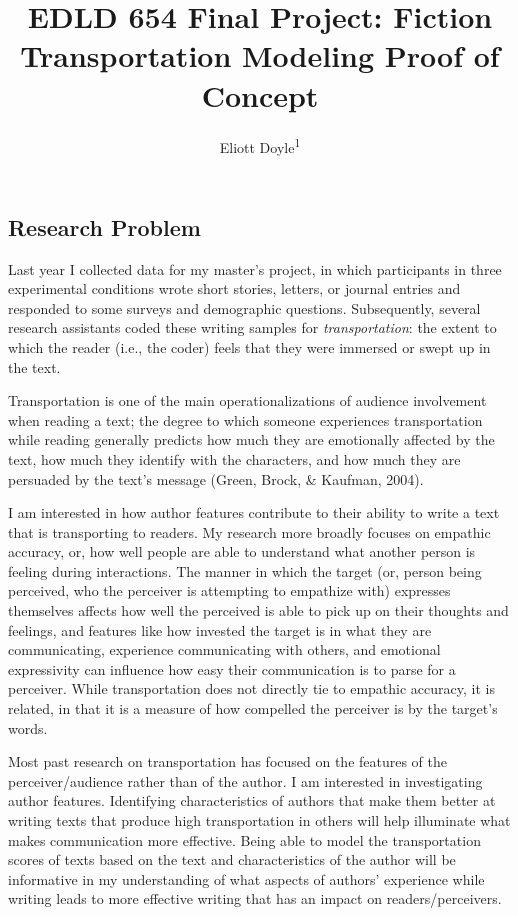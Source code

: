 \documentclass[
  man,floatsintext]{apa6}
\title{EDLD 654 Final Project: Fiction Transportation Modeling Proof of Concept}
\author{Eliott Doyle\textsuperscript{1}}
\date{}
\affiliation{\vspace{0.5cm}\textsuperscript{1} University of Oregon}
\begin{document}
\maketitle

\hypertarget{research-problem}{%
\subsection{Research Problem}\label{research-problem}}

Last year I collected data for my master's project, in which participants in three experimental conditions wrote short stories, letters, or journal entries and responded to some surveys and demographic questions. Subsequently, several research assistants coded these writing samples for \emph{transportation}: the extent to which the reader (i.e., the coder) feels that they were immersed or swept up in the text.

Transportation is one of the main operationalizations of audience involvement when reading a text; the degree to which someone experiences transportation while reading generally predicts how much they are emotionally affected by the text, how much they identify with the characters, and how much they are persuaded by the text's message (Green, Brock, \& Kaufman, 2004).

I am interested in how author features contribute to their ability to write a text that is transporting to readers. My research more broadly focuses on empathic accuracy, or, how well people are able to understand what another person is feeling during interactions. The manner in which the target (or, person being perceived, who the perceiver is attempting to empathize with) expresses themselves affects how well the perceived is able to pick up on their thoughts and feelings, and features like how invested the target is in what they are communicating, experience communicating with others, and emotional expressivity can influence how easy their communication is to parse for a perceiver. While transportation does not directly tie to empathic accuracy, it is related, in that it is a measure of how compelled the perceiver is by the target's words.

Most past research on transportation has focused on the features of the perceiver/audience rather than of the author. I am interested in investigating author features. Identifying characteristics of authors that make them better at writing texts that produce high transportation in others will help illuminate what makes communication more effective. Being able to model the transportation scores of texts based on the text and characteristics of the author will be informative in my understanding of what aspects of authors' experience while writing leads to more effective writing that has an impact on readers/perceivers.
\end{document}
